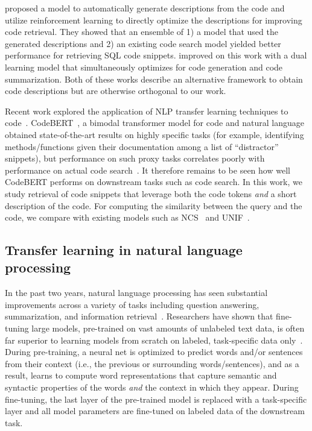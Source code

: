 \documentclass[12pt,conference, onecolumn]{IEEEtran}
\begin{document}
\citet{yao2019coacor} proposed a model to automatically generate descriptions from the code and utilize reinforcement learning to directly optimize the descriptions for improving code retrieval. They showed that an ensemble of 1) a model that used the generated descriptions and 2) an existing code search model yielded better performance for retrieving SQL code snippets.  \citet{ye2020} improved on this work with a dual learning model that simultaneously optimizes for code generation and code summarization. Both of these works describe an alternative framework to obtain code descriptions but are otherwise orthogonal to our work. 

Recent work explored the application of NLP transfer learning techniques to code~\cite{kanade2019pre, Zhangyin:20}. CodeBERT~\cite{Zhangyin:20}, a bimodal transformer model for code and natural language obtained state-of-the-art results on highly specific tasks (for example, identifying methods/functions given their documentation among a list of ``distractor'' snippets), but performance on such proxy tasks correlates poorly with performance on actual code search~\cite{husain2019codesearchnet}. It therefore remains to be seen how well CodeBERT performs on downstream tasks such as code search. In this work, we study retrieval of code snippets that leverage both the code tokens \emph{and} a short description of the code. For computing the similarity between the query and the code, we compare with existing models such as NCS~\cite{sachdev2018retrieval} and UNIF~\cite{cambronero2019deep}.

\subsection{Transfer learning in natural language processing}
In the past two years, natural language processing has seen substantial improvements across a variety of tasks including question answering, summarization, and information retrieval~\cite{raffel2019t5, akkalyoncu-yilmaz-etal-2019-applying}. Researchers have shown that fine-tuning large models, pre-trained on vast amounts of unlabeled text data, is often far superior to learning models from scratch on labeled, task-specific data only~\cite[inter alia]{Peters:2018,Devlin:2018}. During pre-training, a neural net is optimized to predict words and/or sentences from their context (i.e., the previous or surrounding words/sentences), and as a result, learns to compute word representations that capture semantic and syntactic properties of the words \emph{and} the context in which they appear. During fine-tuning, the last layer of the pre-trained model is replaced with a task-specific layer and all model parameters are fine-tuned on labeled data of the downstream task. 
\end{document}
